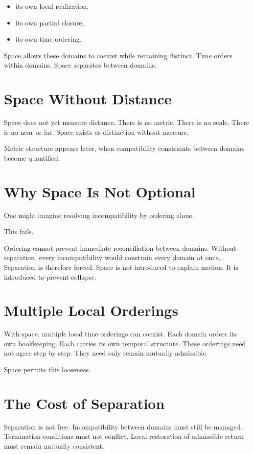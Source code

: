 \documentclass[11pt,twoside,openright]{book}
\begin{document}
\begin{itemize}
\item its own local realization,
\item its own partial closure,
\item its own time ordering.
\end{itemize}

Space allows these domains to coexist while remaining distinct. Time orders within domains. Space separates between domains.

\section*{Space Without Distance}

Space does not yet measure distance. There is no metric. There is no scale. There is no near or far. Space exists as distinction without measure.

Metric structure appears later, when compatibility constraints between domains become quantified.

\section*{Why Space Is Not Optional}

One might imagine resolving incompatibility by ordering alone.

This fails.

Ordering cannot prevent immediate reconciliation between domains. Without separation, every incompatibility would constrain every domain at once. Separation is therefore forced. Space is not introduced to explain motion. It is introduced to prevent collapse.

\section*{Multiple Local Orderings}

With space, multiple local time orderings can coexist. Each domain orders its own bookkeeping. Each carries its own temporal structure. These orderings need not agree step by step. They need only remain mutually admissible.

Space permits this looseness.

\section*{The Cost of Separation}

Separation is not free. Incompatibility between domains must still be managed. Termination conditions must not conflict. Local restoration of admissible return must remain mutually consistent.
\end{document}
